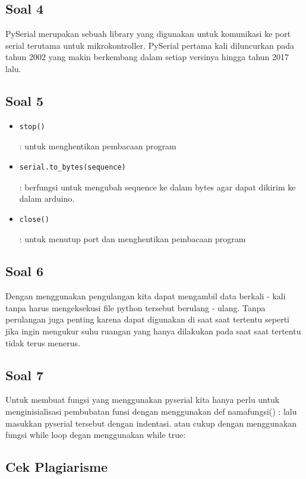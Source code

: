 	\subsection{Soal 4}
	PySerial merupakan sebuah library yang digunakan untuk komunikasi ke port serial terutama untuk mikrokontroller. PySerial pertama kali diluncurkan pada tahun 2002 yang makin berkembang dalam setiap versinya hingga tahun 2017 lalu.

	\subsection{Soal 5}
		\begin{itemize}
			\item \begin{verbatim}stop()\end{verbatim} : untuk menghentikan pembacaan program
			\item \begin{verbatim}serial.to_bytes(sequence)\end{verbatim} : berfungsi untuk mengubah sequence ke dalam bytes agar dapat dikirim ke dalam arduino.
			\item \begin{verbatim}close()\end{verbatim} : untuk menutup port dan menghentikan pembacaan program
		\end{itemize}

	\subsection{Soal 6}
	Dengan menggunakan pengulangan kita dapat mengambil data berkali - kali tanpa harus mengeksekusi file python tersebut berulang - ulang. Tanpa perulangan juga penting karena dapat digunakan di saat saat tertentu seperti jika ingin mengukur suhu ruangan yang hanya dilakukan pada saat saat tertentu tidak terus menerus.

	\subsection{Soal 7}
	Untuk membuat fungsi yang menggunakan pyserial kita hanya perlu untuk menginisialisasi pembubatan funsi dengan menggunakan def namafungsi() : lalu masukkan pyserial tersebut dengan indentasi. atau cukup dengan menggunakan fungsi while loop degan menggunakan while true:

	\subsection{Cek Plagiarisme}

